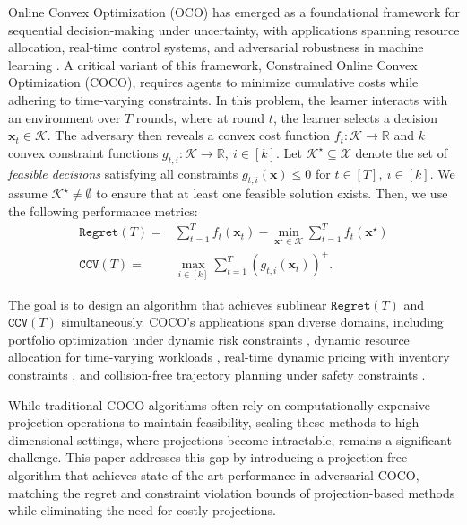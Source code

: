 \documentclass[twoside,11pt,]{article}
\newcommand{\C}[1]{\mathcal{#1}}
\newcommand{\BF}[1]{\mathbf{#1}}
\newcommand{\BB}[1]{\mathbb{#1}}
\newcommand{\K}{\C{K}}
\newcommand{\x}{\BF{x}}
\newcommand{\sumT}{\sum\limits_{t=1}^T}
\renewcommand{\cite}[1]{\citep{#1}}
\begin{document}
Online Convex Optimization (OCO) has emerged as a foundational framework for sequential decision-making under uncertainty, with applications spanning resource allocation, real-time control systems, and adversarial robustness in machine learning \cite{shalev2012online}. A critical variant of this framework, Constrained Online Convex Optimization  (COCO), requires agents to minimize cumulative costs while adhering to time-varying constraints. In this problem, the learner interacts with an environment over $T$ rounds, where at round $t$, the learner selects a decision $\mathbf{x}_t \in \K$. The adversary then reveals a convex cost function $f_t: \K \to \BB{R}$ and  $k$ convex constraint functions $g_{t,i}: \K \to \BB{R},\ i \in [k]$. Let $\K^\star \subseteq \mathcal{X}$ denote the set of \emph{feasible decisions} satisfying all constraints $g_{t,i}(\mathbf{x}) \leq 0$ for $t \in [T],\ i \in [k]$. We assume $\K^\star \neq \emptyset$ to ensure that at least one feasible solution exists. Then, we use the following performance metrics:
\vspace{-.1in}
\begin{align}
    \mathtt{Regret}(T) = &\sumT f_t(\x_t) - \min_{\mathbf{x}^\star \in \K} \sum_{t=1}^T f_t(\mathbf{x}^\star) \\
    \mathtt{CCV}(T) = &\max_{i \in [k]} \sumT \left(g_{t,i}(\x_t)\right)^+.
\end{align}

The goal is to design an algorithm that achieves sublinear $\mathtt{Regret}(T)$ and $\mathtt{CCV}(T)$ simultaneously. COCO's applications span diverse domains, including portfolio optimization under dynamic risk constraints \cite{redeker2018portfolio},  dynamic resource allocation for time-varying workloads \cite{doostmohammadian2022distributed}, real-time dynamic pricing with inventory constraints \cite{li2024dynamic}, and collision-free trajectory planning under safety constraints \cite{da2019collision}.  

While traditional COCO algorithms often rely on computationally expensive projection operations to maintain feasibility, scaling these methods to high-dimensional settings, where projections become intractable, remains a significant challenge. This paper addresses this gap by introducing a projection-free algorithm that achieves state-of-the-art performance in adversarial COCO, matching the regret and constraint violation bounds of projection-based methods while eliminating the need for costly projections.
\end{document}
